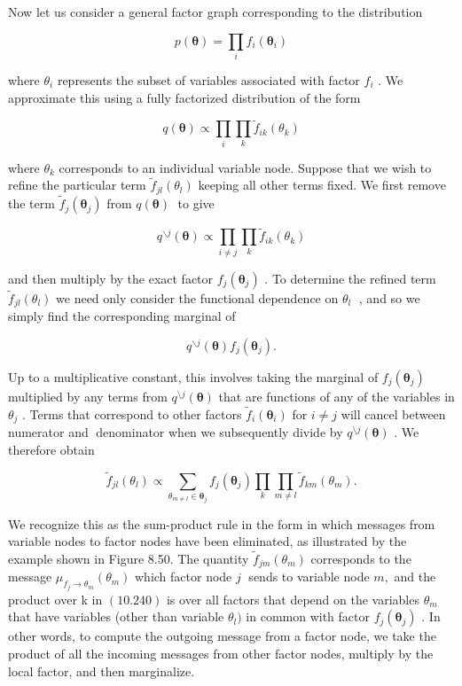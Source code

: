 \documentclass[
  10
]{article}
\begin{document}
Now let us consider a general factor graph corresponding to the
distribution

\[
p (\boldsymbol {\theta}) = \prod_ {i} f _ {i} (\boldsymbol {\theta} _ {i})\tag{10.236}
\]

where \(\theta _ { i }\) represents the subset of variables associated
with factor \(f _ { i }\) . We approximate this using a fully factorized
distribution of the form

\[
q (\boldsymbol {\theta}) \propto \prod_ {i} \prod_ {k} \widetilde {f} _ {i k} (\theta_ {k})\tag{10.237}
\]

where \(\theta _ { k }\) corresponds to an individual variable node.
Suppose that we wish to refine the particular term
\(\widetilde { f } _ { j l } ( \theta _ { l } )\) keeping all other
terms fixed. We first remove the term
\(\widetilde { f } _ { j } ( \pmb { \theta } _ { j } )\) from
\(q ( \pmb \theta )\) to give

\[
q ^ {\backslash j} (\pmb {\theta}) \propto \prod_ {i \neq j} \prod_ {k} \widetilde {f} _ {i k} (\theta_ {k})\tag{10.238}
\]

and then multiply by the exact factor
\(f _ { j } ( \pmb { \theta } _ { j } )\) . To determine the refined
term \(\widetilde { f } _ { j l } ( \theta _ { l } )\) we need only
consider the functional dependence on \(\theta _ { l }\) , and so we
simply find the corresponding marginal of

\[
q ^ {\backslash j} (\boldsymbol {\theta}) f _ {j} \left(\boldsymbol {\theta} _ {j}\right).\tag{10.239}
\]

Up to a multiplicative constant, this involves taking the marginal of
\(f _ { j } ( \pmb { \theta } _ { j } )\) multiplied by any terms from
\(q ^ { \setminus j } ( \pmb \theta )\) that are functions of any of the
variables in \(\theta _ { j }\) . Terms that correspond to other factors
\(\widetilde { f } _ { i } ( \pmb \theta _ { i } )\) for \(i \neq j\)
will cancel between numerator and denominator when we subsequently
divide by \(q ^ { \setminus j } ( \pmb \theta )\) . We therefore obtain

\[
\widetilde {f} _ {j l} (\theta_ {l}) \propto \sum_ {\theta_ {m \neq l} \in \boldsymbol {\theta} _ {j}} f _ {j} (\boldsymbol {\theta} _ {j}) \prod_ {k} \prod_ {m \neq l} \widetilde {f} _ {k m} (\theta_ {m}).\tag{10.240}
\]

We recognize this as the sum-product rule in the form in which messages
from variable nodes to factor nodes have been eliminated, as illustrated
by the example shown in Figure 8.50. The quantity
\(\widetilde { f } _ { j m } ( \theta _ { m } )\) corresponds to the
message \(\mu _ { f _ { j } \to \theta _ { m } } ( \theta _ { m } )\)
which factor node \(j\) sends to variable node \(m ,\) and the product
over k in \(( 1 0 . 2 4 0 )\) is over all factors that depend on the
variables \(\theta _ { m }\) that have variables (other than variable
\(\theta _ { l } )\) in common with factor
\(f _ { j } ( \pmb { \theta } _ { j } )\) . In other words, to compute
the outgoing message from a factor node, we take the product of all the
incoming messages from other factor nodes, multiply by the local factor,
and then marginalize.
\end{document}

